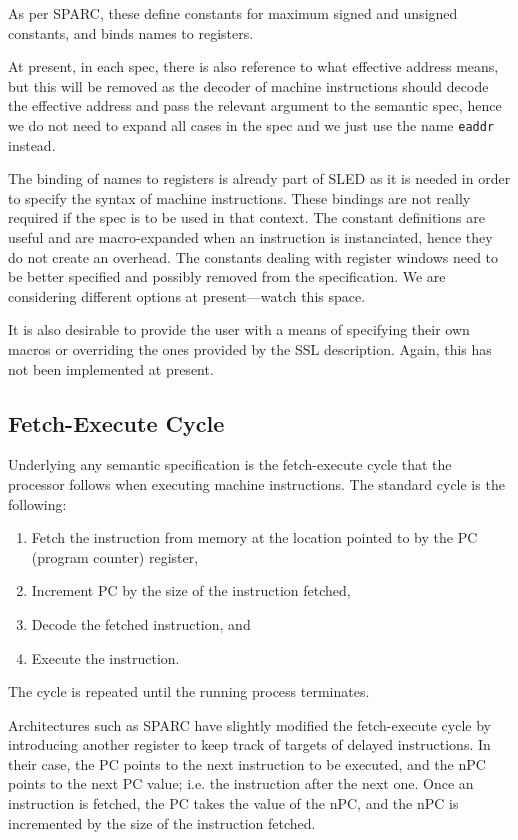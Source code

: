 As per SPARC, these define constants for maximum signed and 
unsigned constants, and binds names to registers.

At present, in each spec, there is also reference to what
effective address means, but this will be removed as 
the decoder of machine instructions should decode the effective
address and pass the relevant argument to the semantic spec,
hence we do not need to expand all cases in the spec and we
just use the name \texttt{eaddr} instead. 

The binding of names to registers is already part of SLED as
it is needed in order to specify the syntax of machine instructions.
These bindings are not really required if the spec is to be
used in that context.
The constant definitions are useful and are macro-expanded 
when an instruction is instanciated, hence they do not 
create an overhead.
The constants dealing with register windows need to be better
specified and possibly removed from the specification. 
We are considering different options at present---watch this
space. 

It is also desirable to provide the user with a means of
specifying their own macros or overriding the ones provided
by the SSL description.  Again, this has not been implemented
at present.


\subsection{Fetch-Execute Cycle}
Underlying any semantic specification is the fetch-execute
cycle that the processor follows when executing machine
instructions.  The standard cycle is the following:
\begin{enumerate}
\item Fetch the instruction from memory at the location
	pointed to by the PC (program counter) register,
\item Increment PC by the size of the instruction fetched,
\item Decode the fetched instruction, and
\item Execute the instruction.
\end{enumerate}
The cycle is repeated until the running process terminates.

Architectures such as SPARC have slightly modified the 
fetch-execute cycle by introducing another register to keep
track of targets of delayed instructions.  In their case,
the PC points to the next instruction to be executed, and
the nPC points to the next PC value; i.e. the instruction
after the next one.  Once an instruction is fetched, the 
PC takes the value of the nPC, and the nPC is incremented
by the size of the instruction fetched.   


